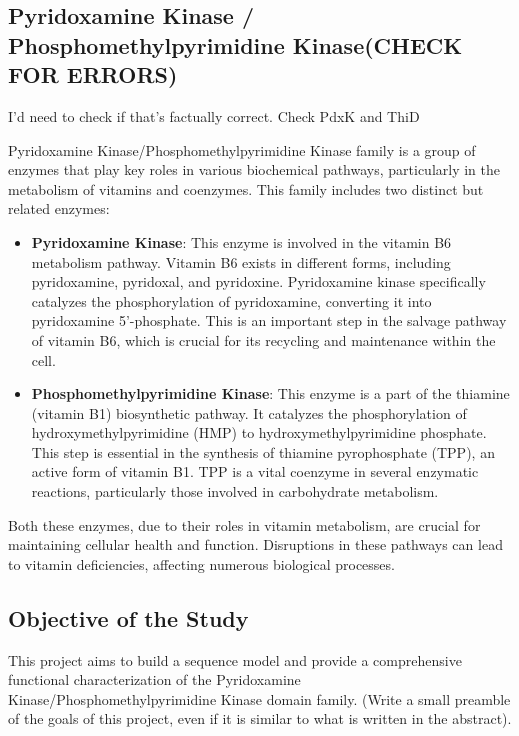 \documentclass[10pt,twocolumn,letterpaper]{article}
\begin{document}
\subsection{Pyridoxamine Kinase / Phosphomethylpyrimidine Kinase(CHECK FOR ERRORS)}

I'd need to check if that's factually correct. Check PdxK and ThiD

Pyridoxamine Kinase/Phosphomethylpyrimidine Kinase family is a group of enzymes that play key roles in various biochemical pathways, particularly in the metabolism of vitamins and coenzymes. This family includes two distinct but related enzymes:

\begin{itemize}
\item \textbf{Pyridoxamine Kinase}: This enzyme is involved in the vitamin B6 metabolism pathway. Vitamin B6 exists in different forms, including pyridoxamine, pyridoxal, and pyridoxine. Pyridoxamine kinase specifically catalyzes the phosphorylation of pyridoxamine, converting it into pyridoxamine 5'-phosphate. This is an important step in the salvage pathway of vitamin B6, which is crucial for its recycling and maintenance within the cell.

\item \textbf{Phosphomethylpyrimidine Kinase}: This enzyme is a part of the thiamine (vitamin B1) biosynthetic pathway. It catalyzes the phosphorylation of hydroxymethylpyrimidine (HMP) to hydroxymethylpyrimidine phosphate. This step is essential in the synthesis of thiamine pyrophosphate (TPP), an active form of vitamin B1. TPP is a vital coenzyme in several enzymatic reactions, particularly those involved in carbohydrate metabolism.
\end{itemize}

Both these enzymes, due to their roles in vitamin metabolism, are crucial for maintaining cellular health and function. Disruptions in these pathways can lead to vitamin deficiencies, affecting numerous biological processes.

\subsection{Objective of the Study}

This project aims to build a sequence model and provide a comprehensive functional characterization of the Pyridoxamine Kinase/Phosphomethylpyrimidine Kinase domain family. (Write a small preamble of the goals of this project, even if it is similar to what is written in the abstract).
\end{document}
